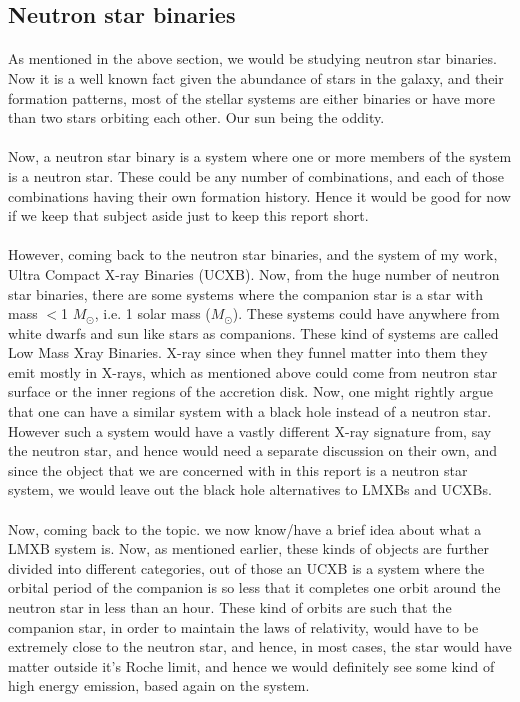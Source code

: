 \documentclass[a4paper,twoside]{report}
\numberwithin{equation}{section}
\begin{document}
\subsection{Neutron star binaries}
\paragraph{}
As mentioned in the above section, we would be studying neutron star binaries. Now it is a well known fact given the abundance of stars in the galaxy, and their formation patterns, most of the stellar systems are either binaries or have more than two stars orbiting each other. Our sun being the oddity. 
\paragraph{}
Now, a neutron star binary is a system where one or more members of the system is a neutron star. These could be any number of combinations, and each of those combinations having their own formation history. Hence it would be good for now if we keep that subject aside just to keep this report short. 
\paragraph{}
However, coming back to the neutron star binaries, and the system of my work, Ultra Compact X-ray Binaries (UCXB). Now, from the huge number of neutron star binaries, there are some systems where the companion star is a star with mass $<$1 \(M_\odot\), i.e. 1 solar mass (\(M_\odot\)). These systems could have anywhere from white dwarfs and sun like stars as companions. These kind of systems are called Low Mass Xray Binaries. X-ray since when they funnel matter into them they emit mostly in X-rays, which as mentioned above could come from neutron star surface or the inner regions of the accretion disk. Now, one might rightly argue that one can have a similar system with a black hole instead of a neutron star. However such a system would have a vastly different X-ray signature from, say the neutron star, and hence would need a separate discussion on their own, and since the object that we are concerned with in this report is a neutron star system, we would leave out the black hole alternatives to LMXBs and UCXBs. 
\paragraph{}
Now, coming back to the topic. we now know/have a brief idea about what a LMXB system is. Now, as mentioned earlier, these kinds of objects are further divided into different categories, out of those an UCXB is a system where the orbital period of the companion is so less that it completes one orbit around the neutron star in less than an hour. These kind of orbits are such that the companion star, in order to maintain the laws of relativity, would have to be extremely close to the neutron star, and hence, in most cases, the star would have matter outside it's Roche limit, and hence we would definitely see some kind of high energy emission, based again on the system. 
\end{document}
